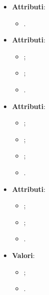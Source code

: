 \documentclass[10pt, a4paper]{article}
\begin{document}
\label{ChatIdDettaglio}
\begin{itemize}
    \item \textbf{Attributi}:
    \begin{itemize}
        \item {}.
    \end{itemize}
\end{itemize}


\label{ChatOperationResponseDettaglio}
\begin{itemize}
    \item \textbf{Attributi}:
    \begin{itemize}
        \item {};
        \item {};
        \item {}.
    \end{itemize}
\end{itemize}

\label{MessageDettaglio}
\begin{itemize}
    \item \textbf{Attributi}:
    \begin{itemize}
        \item {};
        \item {};
        \item {};
        \item {}.
    \end{itemize}
\end{itemize}

\label{MessageResponseDettaglio}
\begin{itemize}
    \item \textbf{Attributi}:
    \begin{itemize}  
        \item {};
        \item {};
        \item {}.
    \end{itemize}
\end{itemize}


\label{MessageSenderDettaglio}
\begin{itemize}
    \item \textbf{Valori}:
    \begin{itemize}
        \item {};
        \item {}.
    \end{itemize}
\end{itemize}
\end{document}
